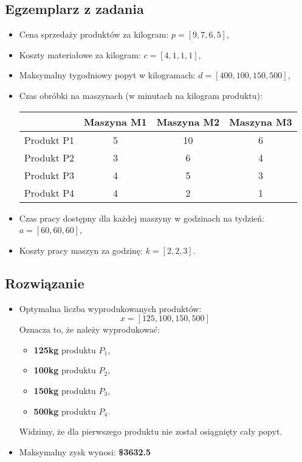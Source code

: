 \documentclass{article}
\begin{document}
\subsection{Egzemplarz z zadania}
\begin{itemize}
    \item Cena sprzedaży produktów za kilogram: \( p = [9, 7, 6, 5] \),
    \item Koszty materiałowe za kilogram: \( c = [4, 1, 1, 1] \),
    \item Maksymalny tygodniowy popyt w kilogramach: \( d = [400, 100, 150, 500] \),
    \item Czas obróbki na maszynach (w minutach na kilogram produktu):
        \begin{table}[H]
            \centering
            \begin{tabular}{|c|c|c|c|}
                \hline
                & Maszyna M1 & Maszyna M2 & Maszyna M3 \\
                \hline
                Produkt P1 & 5 & 10 & 6 \\
                \hline
                Produkt P2 & 3 & 6 & 4 \\
                \hline
                Produkt P3 & 4 & 5 & 3 \\
                \hline
                Produkt P4 & 4 & 2 & 1 \\
                \hline
            \end{tabular}
        \end{table}
    \item Czas pracy dostępny dla każdej maszyny w godzinach na tydzień: \( a = [60, 60, 60] \),
    \item Koszty pracy maszyn za godzinę: \( k = [2, 2, 3] \).
\end{itemize}

\subsection{Rozwiązanie}
\begin{itemize}
    \item Optymalna liczba wyprodukowanych produktów:
    \[
    x = [125, 100, 150, 500]
    \]
    Oznacza to, że należy wyprodukować:
    \begin{itemize}
        \item \textbf{125kg} produktu \( P_1 \),
        \item \textbf{100kg} produktu \( P_2 \),
        \item \textbf{150kg} produktu \( P_3 \),
        \item \textbf{500kg} produktu \( P_4 \).
    \end{itemize}
    Widzimy, że dla pierwszego produktu nie został osiągnięty cały popyt.

    \item Maksymalny zysk wynosi:
    \textbf{\$3632.5}
\end{itemize}
\end{document}

